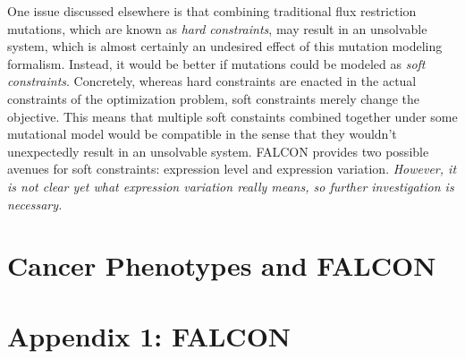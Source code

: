\documentclass[phd,tocprelim]{cornell}
\newcommand*{\commonDir}{../common/}   %
\begin{document}
One issue discussed elsewhere is that combining traditional flux
restriction mutations, which are known as \emph{hard constraints}, may
result in an unsolvable system, which is almost certainly an undesired
effect of this mutation modeling formalism. Instead, it would be
better if mutations could be modeled as \emph{soft
  constraints}. Concretely, whereas hard constraints are enacted in
the actual constraints of the optimization problem, soft constraints
merely change the objective. This means that multiple soft constaints
combined together under some mutational model would be compatible in
the sense that they wouldn't unexpectedly result in an unsolvable
system. FALCON provides two possible avenues for soft constraints:
expression level and expression variation. \emph{However, it is not
  clear yet what expression variation really means, so further
  investigation is necessary.}

\chapter{Cancer Phenotypes and FALCON}

\appendix

\chapter{Appendix 1: FALCON}




\end{document}
